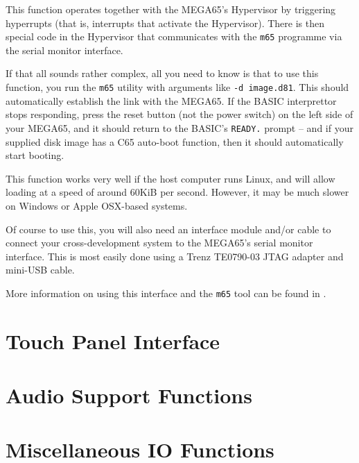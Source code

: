 This function operates together with the MEGA65's Hypervisor by
triggering hyperrupts (that is, interrupts that activate the
Hypervisor).  There is then special code in the Hypervisor that
communicates with the {\tt m65} programme via the serial monitor
interface.

If that all sounds rather complex, all you need to know is that to use
this function, you run the {\tt m65} utility with arguments like
{\tt -d image.d81}.  This should automatically establish the link with
the MEGA65.  If the BASIC interprettor stops responding, press the
reset button (not the power switch) on the left side of your MEGA65,
and it should return to the BASIC's {\tt READY.} prompt -- and if your
supplied disk image has a C65 auto-boot function, then it should
automatically start booting.

This function works very well if the host computer runs Linux, and
will allow loading at a speed of around 60KiB per second.  However, it
may be much slower on Windows or Apple OSX-based systems.

Of course to use this, you will also need an interface module and/or
cable to connect your cross-development system to the MEGA65's serial
monitor interface. This is most easily done using a Trenz TE0790-03
JTAG adapter and mini-USB cable.

More information on using this interface and the {\tt m65} tool can be
found in .

\section{Touch Panel Interface}

\section{Audio Support Functions}

\section{Miscellaneous IO Functions}

